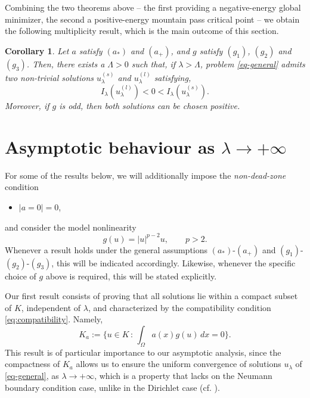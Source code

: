 \documentclass[11pt,reqno]{amsart}
\theoremstyle{plain}
\newtheorem{corollary}[theorem]{Corollary}
\theoremstyle{definition}
\numberwithin{equation}{section}
\begin{document}
Combining the two theorems above -- the first providing a negative-energy global minimizer, the second a positive-energy mountain pass critical point -- we obtain the following multiplicity result, which is the main outcome of this section.

\begin{corollary}
    Let $a$ satisfy $(a_*)$ and $(a_+)$, and $g$ satisfy $(g_1)$, $(g_2)$ and $(g_3)$. Then, there exists a $\Lambda >0$ such that, if $\lambda > \Lambda $, problem \eqref{eq-general} admits two non-trivial solutions $u_{\lambda}^{(s)}$ and $u_\lambda^{(l)}$ satisfying,
    $$I_\lambda(u_{\lambda}^{(l)}) < 0 < I_{\lambda}(u_\lambda^{(s)}).$$
    Moreover, if $g$ is odd, then both solutions can be chosen positive.
\end{corollary}

\section{Asymptotic behaviour as $\lambda \to +\infty$} \label{sec4}

For some of the results below, we will additionally impose the \emph{non-dead-zone} condition

\begin{itemize}
\item[$(a_0)$] $|{a=0}|=0$,
\end{itemize}
and consider the model nonlinearity
$$
g(u)=|u|^{p-2}u,\qquad p>2.
$$
Whenever a result holds under the general assumptions $(a_\ast)$-$(a_+)$ and $(g_1)$-$(g_2)$-$(g_3)$, this will be indicated accordingly. Likewise, whenever the specific choice of $g$ above is required, this will be stated explicitly.

\medskip

Our first result consists of proving that all solutions lie within a compact subset of $K$, independent of $\lambda$, and characterized by the compatibility condition \eqref{eq:compatibility}. Namely, 
\begin{equation} \label{eq:Ka} K_a:= \{ u \in K \, : \, \int_\Omega a (x)g(u) \, dx = 0 \}.\end{equation}
This result is of particular importance to our asymptotic analysis, since the compactness of $K_a$ allows us to ensure the uniform convergence of solutions $u_\lambda$ of \eqref{eq-general}, as $\lambda \to + \infty$, which is a property that lacks on the Neumann boundary condition case, unlike in the Dirichlet case (cf. \cite{BeJeMa14, BoCoZi26}). 
\end{document}
